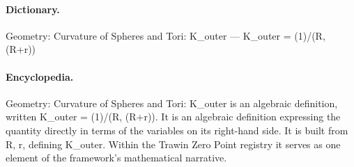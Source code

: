 \paragraph{Dictionary.}
Geometry: Curvature of Spheres and Tori: K\_outer — K\_outer = (1)/(R, (R+r))

\paragraph{Encyclopedia.}
Geometry: Curvature of Spheres and Tori: K\_outer is an algebraic definition, written K\_outer = (1)/(R, (R+r)). It is an algebraic definition expressing the quantity directly in terms of the variables on its right-hand side. It is built from R, r, defining K\_outer. Within the Trawin Zero Point registry it serves as one element of the framework's mathematical narrative.
